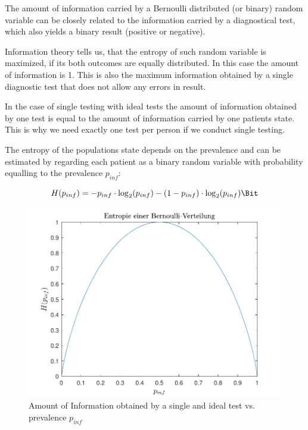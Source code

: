 \documentclass[fleqn,10pt]{wlscirep}
\begin{document}
The amount of information carried by a Bernoulli distributed (or binary) random variable can be closely related to the information carried by a diagnostical test, which also yields a binary result (positive or negative).

Information theory tells us, that the entropy of such random variable is maximized, if its both outcomes are equally distributed. In this case the amount of information is \SI{1}{\Bit}. This is also the maximum information obtained by a single diagnostic test that does not allow any errors in result.

In the case of single testing with ideal tests the amount of information obtained by one test is equal to the amount of information carried by one patients state. This is why we need exactly one test per person if we conduct single testing.

The entropy of the populations state depends on the prevalence and can be estimated by regarding each patient as a binary random variable with probability equalling to the prevalence $p_{inf}$:

\begin{equation}
H(p_{inf}) = -p_{inf} \cdot \log_2(p_{inf})-(1-p_{inf}) \cdot \log_2(p_{inf}) \si{\Bit}
\end{equation}

\begin{figure}[ht]
	\centering
	\includegraphics[]{pics/Bin_Entropie.pdf}
	\caption{Amount of Information obtained by a single and ideal test vs. prevalence $p_{inf}$}
	\label{fig:bin_entropie}
\end{figure}
\end{document}
